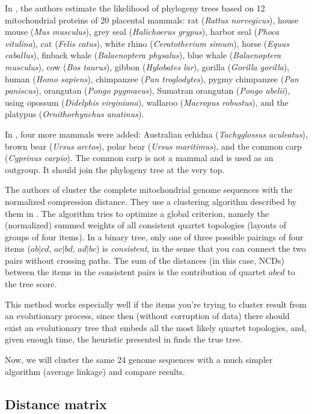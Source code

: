 In \cite{Cao1998}, the authors estimate the likelihood of phylogeny trees
based on 12 mitochondrial proteins of 20 placental mammals: rat
(\emph{Rattus norvegicus}), house mouse (\emph{Mus musculus}), grey seal
(\emph{Halichoerus grypus}), harbor seal (\emph{Phoca vitulina}), cat
(\emph{Felis catus}), white rhino (\emph{Ceratotherium simum}), horse
(\emph{Equus caballus}), finback whale (\emph{Balaenoptera physalus}),
blue whale (\emph{Balaenoptera musculus}), cow (\emph{Bos taurus}), gibbon
(\emph{Hylobates lar}), gorilla (\emph{Gorilla gorilla}), human
(\emph{Homo sapiens}), chimpanzee (\emph{Pan troglodytes}), pygmy
chimpanzee (\emph{Pan paniscus}), orangutan (\emph{Pongo pygmaeus}),
Sumatran orangutan (\emph{Pongo abelii}), using opossum (\emph{Didelphis
virginiana}), wallaroo (\emph{Macropus robustus}), and the platypus
(\emph{Ornithorhynchus anatinus}).

In \cite{Cilibrasi2005}, four more mammals were added: Australian echidna
(\emph{Tachyglossus aculeatus}), brown bear (\emph{Ursus arctos}), polar
bear (\emph{Ursus maritimus}), and the common carp (\emph{Cyprinus
carpio}). The common carp is not a mammal and is used as an outgroup. It
should join the phylogeny tree at the very top.

The authors of \cite{Cilibrasi2005} cluster the complete mitochondrial
genome sequences with the normalized compression distance. They use
a clustering algorithm described by them in
\cite{Cilibrasi2011}. The algorithm tries to optimize a global criterion,
namely the (normalized) summed weights of all consistent quartet
topologies (layouts of groups of four items). In a binary tree, only one
of three possible pairings of four items ($ab|cd$, $ac|bd$, $ad|bc$) is
\emph{consistent}, in the sense that you can connect the two pairs without
crossing paths. The sum of the distances (in this case, $\text{NCD}$s)
between the items in the consistent pairs is the contribution of quartet
$abcd$ to the tree score.

This method works especially well if the items you're trying to cluster
result from an evolutionary process, since then (without corruption of
data) there should exist an evolutionary tree that embeds all the most
likely quartet topologies, and, given enough time, the heuristic presented
in \cite{Cilibrasi2011} finds the true tree.

Now, we will cluster the same 24 genome sequences with a much simpler
algorithm (average linkage) and compare results.

\subsection{Distance matrix}

